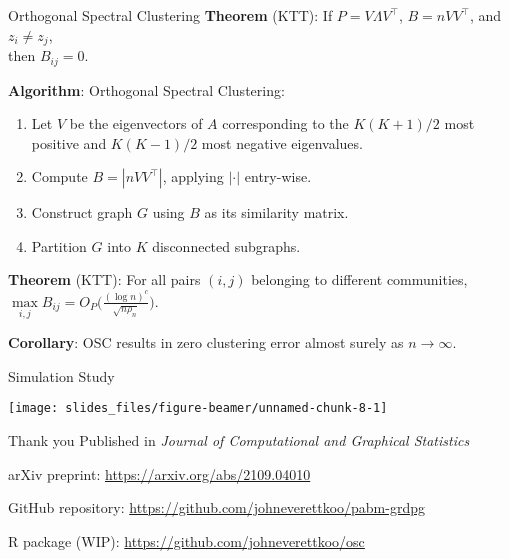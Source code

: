 \documentclass[
  ignorenonframetext,
]{beamer}
\providecommand{\tightlist}{%
  \setlength{\itemsep}{0pt}\setlength{\parskip}{0pt}}
\begin{document}
\begin{frame}{Orthogonal Spectral Clustering}
\protect\hypertarget{orthogonal-spectral-clustering}{}
\textbf{Theorem} (KTT): If \(P = V \Lambda V^\top\), \(B = n V V^\top\),
and \(z_i \neq z_j\),\\
then \(B_{ij} = 0\).

\textbf{Algorithm}: Orthogonal Spectral Clustering:

\begin{enumerate}
\tightlist
\item
  Let \(V\) be the eigenvectors of \(A\) corresponding to the
  \(K (K+1)/2\) most positive and \(K (K-1) / 2\) most negative
  eigenvalues.
\item
  Compute \(B = |n V V^\top|\), applying \(|\cdot|\) entry-wise.
\item
  Construct graph \(G\) using \(B\) as its similarity matrix.
\item
  Partition \(G\) into \(K\) disconnected subgraphs.
\end{enumerate}

\textbf{Theorem} (KTT): For all pairs \((i, j)\) belonging to different
communities,
\(\max\limits_{i, j} B_{ij} = O_P \Big( \frac{(\log n)^c}{\sqrt{n \rho_n}} \Big)\).

\textbf{Corollary}: OSC results in zero clustering error almost surely
as \(n \to \infty\).
\end{frame}

\begin{frame}{Simulation Study}
\protect\hypertarget{simulation-study}{}
\begin{center}\texttt{[image: slides\_files/figure-beamer/unnamed-chunk-8-1]} \end{center}
\end{frame}

\begin{frame}{Thank you}
\protect\hypertarget{thank-you}{}
Published in \emph{Journal of Computational and Graphical Statistics}

arXiv preprint: \url{https://arxiv.org/abs/2109.04010}

GitHub repository: \url{https://github.com/johneverettkoo/pabm-grdpg}

R package (WIP): \url{https://github.com/johneverettkoo/osc}
\end{frame}
\end{document}
